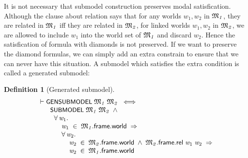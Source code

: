 \documentclass[letterpaper]{article}
\newtheorem{defn}{Definition}
\renewcommand{\HOLConst}[1]{{\textsf{\upshape\small #1}}}
\renewcommand{\HOLinline}[1]{\ensuremath{#1}}
\newenvironment{holmath}{\begin{displaymath}\begin{array}{l}}{\end{array}\end{displaymath}\ignorespacesafterend}
\begin{document}
It is not necessary that submodel construction preserves modal satisfication. Although the clause about relation says that for any worlds $w_1,w_2$ in \HOLinline{\HOLFreeVar{\ensuremath{\mathfrak{M}\sb{1}}}}, they are related in \HOLinline{\HOLFreeVar{\ensuremath{\mathfrak{M}\sb{1}}}} iff they are related in \HOLinline{\HOLFreeVar{\ensuremath{\mathfrak{M}\sb{2}}}}, for linked worlds $w_1,w_2$ in \HOLinline{\HOLFreeVar{\ensuremath{\mathfrak{M}\sb{2}}}}, we are allowed to include $w_1$ into the world set of \HOLinline{\HOLFreeVar{\ensuremath{\mathfrak{M}\sb{1}}}} and discard $w_2$. Hence the satisfication of formula with diamonds is not preserved. If we want to preserve the diamond formulas, we can simply add an extra constrain to ensure that we can never have this situation. A submodel which satisfies the extra condition is called a generated submodel:


\begin{defn}[Generated submodel]
\begin{holmath}
  \ensuremath{\HOLTokenTurnstile}\HOLConst{GENSUBMODEL}\;\HOLFreeVar{\ensuremath{\mathfrak{M}\sb{1}}}\;\HOLFreeVar{\ensuremath{\mathfrak{M}\sb{2}}}\;\HOLSymConst{\HOLTokenEquiv{}}\\
\;\;\;\;\;\;\;\HOLConst{SUBMODEL}\;\HOLFreeVar{\ensuremath{\mathfrak{M}\sb{1}}}\;\HOLFreeVar{\ensuremath{\mathfrak{M}\sb{2}}}\;\HOLSymConst{\HOLTokenConj{}}\\
\;\;\;\;\;\;\;\;\;\HOLSymConst{\HOLTokenForall{}}\HOLBoundVar{w\sb{\mathrm{1}}}.\\
\;\;\;\;\;\;\;\;\;\;\;\;\;\HOLBoundVar{w\sb{\mathrm{1}}}\;\HOLSymConst{\HOLTokenIn{}}\;\HOLFreeVar{\ensuremath{\mathfrak{M}\sb{1}}}.\HOLFieldName{frame}.\HOLFieldName{world}\;\HOLSymConst{\HOLTokenImp{}}\\
\;\;\;\;\;\;\;\;\;\;\;\;\;\HOLSymConst{\HOLTokenForall{}}\HOLBoundVar{w\sb{\mathrm{2}}}.\\
\;\;\;\;\;\;\;\;\;\;\;\;\;\;\;\;\;\HOLBoundVar{w\sb{\mathrm{2}}}\;\HOLSymConst{\HOLTokenIn{}}\;\HOLFreeVar{\ensuremath{\mathfrak{M}\sb{2}}}.\HOLFieldName{frame}.\HOLFieldName{world}\;\HOLSymConst{\HOLTokenConj{}}\;\HOLFreeVar{\ensuremath{\mathfrak{M}\sb{2}}}.\HOLFieldName{frame}.\HOLFieldName{rel}\;\HOLBoundVar{w\sb{\mathrm{1}}}\;\HOLBoundVar{w\sb{\mathrm{2}}}\;\HOLSymConst{\HOLTokenImp{}}\\
\;\;\;\;\;\;\;\;\;\;\;\;\;\;\;\;\;\HOLBoundVar{w\sb{\mathrm{2}}}\;\HOLSymConst{\HOLTokenIn{}}\;\HOLFreeVar{\ensuremath{\mathfrak{M}\sb{1}}}.\HOLFieldName{frame}.\HOLFieldName{world}
\end{holmath}
\end{defn}
\end{document}
